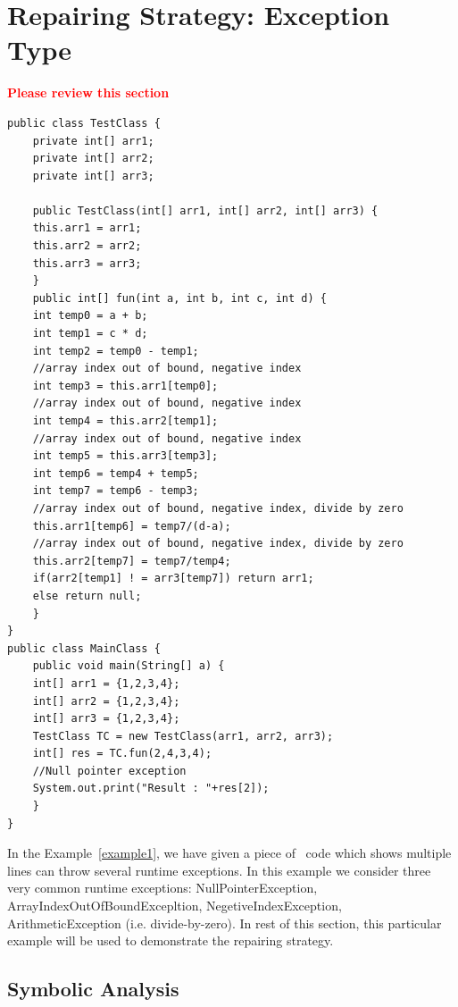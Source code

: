 \section{Repairing Strategy: Exception Type}
\label{sec:strgEx}

\textcolor{red}{\textbf{Please review this section}}\newline


\lstset{language=Java, caption=Java code which may throws runtime exceptions,
label=example1}
\begin{lstlisting}[countblanklines=false]
public class TestClass {
    private int[] arr1;
    private int[] arr2;
    private int[] arr3;

    public TestClass(int[] arr1, int[] arr2, int[] arr3) {
	this.arr1 = arr1;
	this.arr2 = arr2;
	this.arr3 = arr3;
    }
    public int[] fun(int a, int b, int c, int d) {
	int temp0 = a + b;
	int temp1 = c * d;
	int temp2 = temp0 - temp1;
	//array index out of bound, negative index
	int temp3 = this.arr1[temp0];
	//array index out of bound, negative index
	int temp4 = this.arr2[temp1];
	//array index out of bound, negative index
	int temp5 = this.arr3[temp3];
	int temp6 = temp4 + temp5;
	int temp7 = temp6 - temp3;
	//array index out of bound, negative index, divide by zero
	this.arr1[temp6] = temp7/(d-a);
	//array index out of bound, negative index, divide by zero
	this.arr2[temp7] = temp7/temp4;
	if(arr2[temp1] ! = arr3[temp7]) return arr1;
	else return null;
    }
}
public class MainClass {
    public void main(String[] a) {
	int[] arr1 = {1,2,3,4};
	int[] arr2 = {1,2,3,4};
	int[] arr3 = {1,2,3,4};
	TestClass TC = new TestClass(arr1, arr2, arr3);
	int[] res = TC.fun(2,4,3,4);
	//Null pointer exception
	System.out.print("Result : "+res[2]);
    }    
}
\end{lstlisting}

In the Example~\ref{example1}, we have given a piece of \java\ code which shows
multiple lines can throw several runtime exceptions.
In this example we consider three very common runtime exceptions:
NullPointerException, ArrayIndexOutOfBoundExcepltion, NegetiveIndexException,
ArithmeticException (i.e. divide-by-zero). In rest of this section, this
particular example will be used to demonstrate the repairing strategy.

\subsection{Symbolic Analysis}
\label{subsec:symb}


